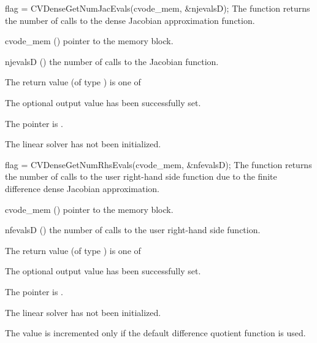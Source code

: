 {
  flag = CVDenseGetNumJacEvals(cvode\_mem, \&njevalsD);
}
{
  The function  returns the
  number of calls to the dense Jacobian approximation function.
}
{
  \begin{args}
  \item[cvode\_mem] ()
    pointer to the {\cvode} memory block.
  \item[njevalsD] ()
    the number of calls to the Jacobian function.
  \end{args}
}
{
  The return value  (of type ) is one of
  \begin{args}
  \item[\Id{CVDENSE\_SUCCESS}] 
    The optional output value has been successfully set.
  \item[\Id{CVDENSE\_MEM\_NULL}]
    The  pointer is .
  \item[\Id{CVDENSE\_LMEM\_NULL}]
    The {\cvdense} linear solver has not been initialized.
  \end{args}
}
{}
{
  flag = CVDenseGetNumRhsEvals(cvode\_mem, \&nfevalsD);
}
{
  The function  returns the
  number of calls to the user right-hand side function due to the 
  finite difference dense Jacobian approximation.
}
{
  \begin{args}
  \item[cvode\_mem] ()
    pointer to the {\cvode} memory block.
  \item[nfevalsD] ()
    the number of calls to the user right-hand side function.
  \end{args}
}
{
  The return value  (of type ) is one of
  \begin{args}
  \item[\Id{CVDENSE\_SUCCESS}] 
    The optional output value has been successfully set.
  \item[\Id{CVDENSE\_MEM\_NULL}]
    The  pointer is .
  \item[\Id{CVDENSE\_LMEM\_NULL}]
    The {\cvdense} linear solver has not been initialized.
  \end{args}
}
{
  The value  is incremented only if the default 
   difference quotient function is used.
}
